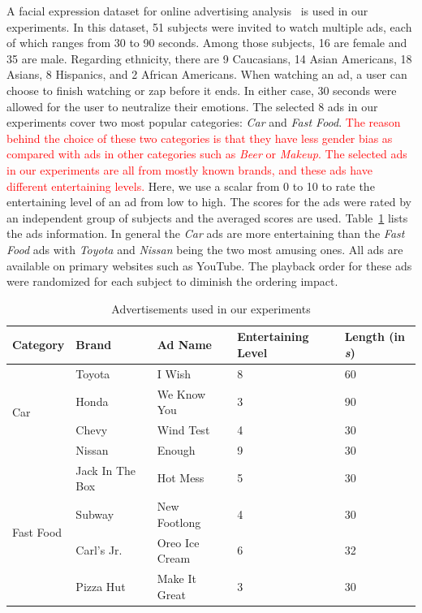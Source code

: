 \documentclass[twoside,leqno,twocolumn]{article}
\newcommand{\Songfan}[1]{\textcolor{red}{#1}}
\begin{document}
A facial expression dataset for online advertising analysis~\cite{Yang_FG15} is used in our experiments. In this dataset, 51 subjects were invited to watch multiple ads, each of which ranges from 30 to 90 seconds. Among those subjects, 16 are female and 35 are male. Regarding ethnicity, there are 9 Caucasians, 14 Asian Americans, 18 Asians, 8 Hispanics, and 2 African Americans. When watching an ad, a user can choose to finish watching or zap before it ends. In either case, 30 seconds were allowed for the user to neutralize their emotions. The selected 8 ads in our experiments cover two most popular categories: \textit{Car} and \textit{Fast Food}. \Songfan{The reason behind the choice of these two categories is that they have less gender bias as compared with ads in other categories such as \textit{Beer} or \textit{Makeup}. The selected ads in our experiments are all from mostly known brands, and these ads have different entertaining levels.} Here, we use a scalar from 0 to 10 to rate the entertaining level of an ad from low to high. The scores for the ads were rated by an independent group of subjects and the averaged scores are used. Table~\ref{table:ads} lists the ads information. In general the \textit{Car} ads are more entertaining than the \textit{Fast Food} ads with \textit{Toyota} and \textit{Nissan} being the two most amusing ones. All ads are available on primary websites such as YouTube. The playback order for these ads were randomized for each subject to diminish the ordering impact. 

\begin{table}[!t]
\caption{Advertisements used in our experiments} \label{table:ads}
\centering
\begin{tabular}{lllll}
\toprule
Category & Brand & Ad Name & Entertaining Level & Length (in \textit{s}) \\ \midrule

\multirow{4}{*}{Car}        & Toyota & I Wish  & 8 & 60			\\ %
                            & Honda  & We Know You  & 3 & 90 \\ %
                            & Chevy  & Wind Test  & 4 & 30  \\ %
                            & Nissan & Enough   & 9 & 30    \\ %
\midrule 
\multirow{4}{*}{Fast Food} & Jack In The Box & Hot Mess               & 5 &  30 \\ %
                            & Subway                & New Footlong    & 4 & 30 \\ %
                            & Carl's Jr.            & Oreo Ice Cream  & 6 &  32 \\ %
                            & Pizza Hut             & Make It Great   & 3 & 30 \\ %
\bottomrule
\end{tabular}
\end{table} 
\end{document}
